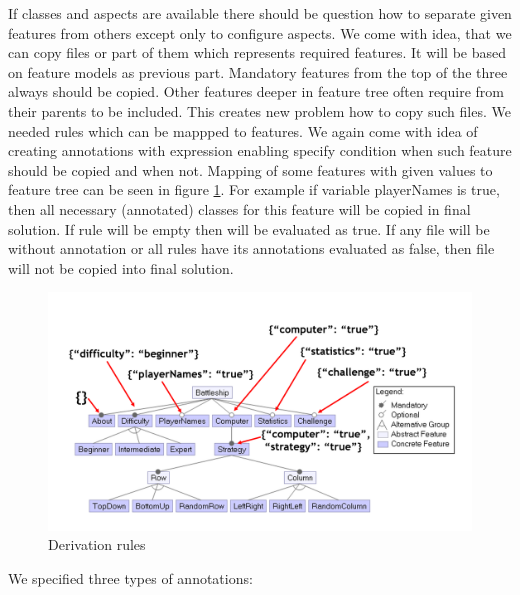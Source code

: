 \documentclass[11pt,english,a4paper,twoside]{article}
\begin{document}
If classes and aspects are available there should be question how to separate given features from others except only to configure aspects. We come with idea, that we can copy files or part of them which represents required features. It will be based on feature models as previous part. Mandatory features from the top of the three always should be copied. Other features deeper in feature tree often require from their parents to be included. This creates new problem how to copy such files. We needed rules which can be mappped to features. We again come with idea of creating annotations with expression enabling specify condition when such feature should be copied and when not. Mapping of some features with given values to feature tree can be seen in figure \ref{derivationRules}. For example if variable playerNames is true, then all necessary (annotated) classes for this feature will be copied in final solution. If rule will be empty then will be evaluated as true. If any file will be without annotation or all rules have its annotations evaluated as false, then file will not be copied into final solution.

\begin{figure}[H]  %
					\begin{center}
									\includegraphics[width=\linewidth]{fig/derivationRules.png}
									\caption{Derivation rules}
									\label{derivationRules}
					\end{center}
\end{figure}


We specified three types of annotations:
\end{document}
